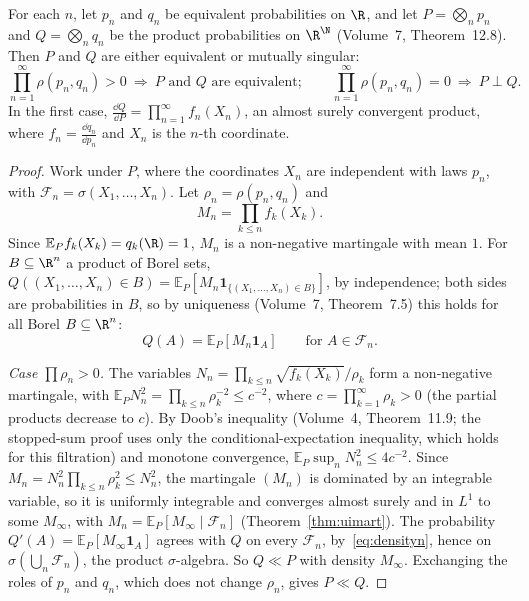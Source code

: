 \begin{theorem}[Kakutani, 1948]\label{thm:kakutani}
For each $n$, let $p_n$ and $q_n$ be equivalent probabilities on $\R$, and let $P=\bigotimes_np_n$ and $Q=\bigotimes_nq_n$ be the product probabilities on $\R^\N$ (Volume~7, Theorem~12.8). Then $P$ and $Q$ are
either equivalent or mutually singular:
\[
\prod_{n=1}^\infty\rho(p_n,q_n)>0\ \Longrightarrow\ P\text{ and }Q\text{ are equivalent};\qquad\prod_{n=1}^\infty\rho(p_n,q_n)=0\ \Longrightarrow\ P\perp Q.
\]
In the first case, $\frac{\dd Q}{\dd P}=\prod_{n=1}^\infty f_n(X_n)$, an almost surely convergent product, where $f_n=\frac{\dd q_n}{\dd p_n}$ and $X_n$ is the $n$-th coordinate.
\end{theorem}
\begin{proof}
Work under $P$, where the coordinates $X_n$ are independent with laws $p_n$, with $\mathcal F_n=\sigma(X_1,\dots,X_n)$. Let $\rho_n=\rho(p_n,q_n)$ and
\[
M_n=\prod_{k\le n}f_k(X_k).
\]
Since $\mathbb E_Pf_k(X_k)=q_k(\R)=1$, $M_n$ is a non-negative martingale with mean $1$. For $B\subseteq\R^n$ a product of Borel sets, $Q((X_1,\dots,X_n)\in B)=\mathbb E_P[M_n\mathbf 1_{\{(X_1,\dots,X_n)\in B\}}]$, by
independence; both sides are probabilities in $B$, so by uniqueness (Volume~7, Theorem~7.5) this holds for all Borel $B\subseteq\R^n$:
\begin{equation}\label{eq:densityn}
Q(A)=\mathbb E_P[M_n\mathbf 1_A]\qquad\text{for }A\in\mathcal F_n.
\end{equation}

\emph{Case $\prod\rho_n>0$.} The variables $N_n=\prod_{k\le n}\sqrt{f_k(X_k)}/\rho_k$ form a non-negative martingale, with $\mathbb E_PN_n^2=\prod_{k\le n}\rho_k^{-2}\le c^{-2}$, where
$c=\prod_{k=1}^\infty\rho_k>0$ (the partial products decrease to $c$). By Doob's inequality (Volume~4, Theorem~11.9; the stopped-sum proof uses only the conditional-expectation inequality, which holds for this filtration) and monotone convergence, $\mathbb E_P\sup_nN_n^2\le4c^{-2}$. Since
$M_n=N_n^2\prod_{k\le n}\rho_k^2\le N_n^2$, the martingale $(M_n)$ is dominated by an integrable variable, so it is uniformly integrable and converges almost surely and in $L^1$ to some $M_\infty$, with
$M_n=\mathbb E_P[M_\infty\mid\mathcal F_n]$ (Theorem~\ref{thm:uimart}). The probability $Q'(A)=\mathbb E_P[M_\infty\mathbf 1_A]$ agrees with $Q$ on every $\mathcal F_n$, by~\eqref{eq:densityn}, hence on $\sigma(\bigcup_n\mathcal F_n)$, the product
$\sigma$-algebra. So $Q\ll P$ with density $M_\infty$. Exchanging the roles of $p_n$ and $q_n$, which does not change $\rho_n$, gives $P\ll Q$.


\end{proof}
